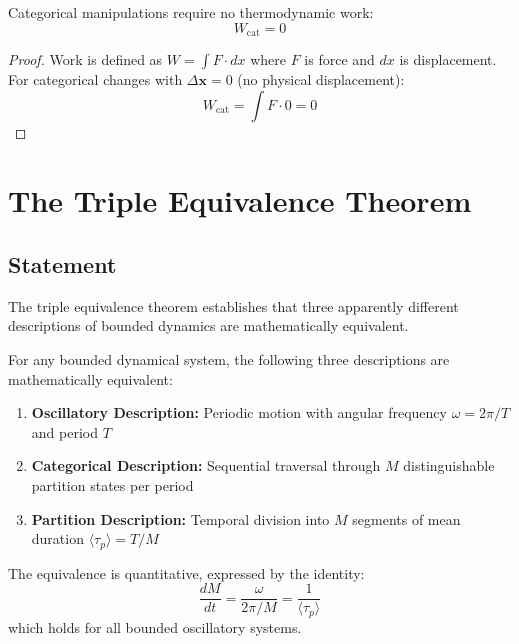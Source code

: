 \begin{corollary}
\label{cor:zero_work}
Categorical manipulations require no thermodynamic work:
\begin{equation}
W_{\text{cat}} = 0
\end{equation}
\end{corollary}

\begin{proof}
Work is defined as $W = \int F \cdot dx$ where $F$ is force and $dx$ is displacement. For categorical changes with $\Delta \mathbf{x} = 0$ (no physical displacement):
\begin{equation}
W_{\text{cat}} = \int F \cdot 0 = 0
\end{equation}
\end{proof}

\section{The Triple Equivalence Theorem}

\subsection{Statement}

The triple equivalence theorem establishes that three apparently different descriptions of bounded dynamics are mathematically equivalent.

\begin{theorem}
\label{thm:triple_equivalence}
For any bounded dynamical system, the following three descriptions are mathematically equivalent:
\begin{enumerate}[label=(\roman*)]
    \item \textbf{Oscillatory Description:} Periodic motion with angular frequency $\omega = 2\pi/T$ and period $T$
    \item \textbf{Categorical Description:} Sequential traversal through $M$ distinguishable partition states per period
    \item \textbf{Partition Description:} Temporal division into $M$ segments of mean duration $\langle\tau_p\rangle = T/M$
\end{enumerate}

The equivalence is quantitative, expressed by the identity:
\begin{equation}
\frac{dM}{dt} = \frac{\omega}{2\pi/M} = \frac{1}{\langle\tau_p\rangle}
\label{eq:triple_identity}
\end{equation}
which holds for all bounded oscillatory systems.
\end{theorem}

